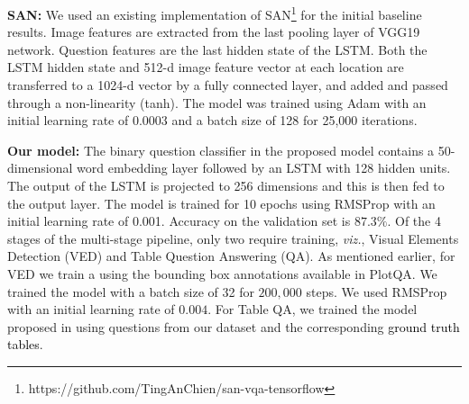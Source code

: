 \documentclass[10pt,twocolumn,letterpaper]{article}
\begin{document}
\noindent\textbf{SAN:} We used an existing implementation of SAN\footnote{https://github.com/TingAnChien/san-vqa-tensorflow} for the initial baseline results. Image features are extracted from the last pooling layer of VGG19 network. Question features are the last hidden state of the LSTM. Both the LSTM hidden state and 512-d image feature vector at each location are transferred to a 1024-d vector by a fully connected layer, and added and passed through a non-linearity (tanh). The model was trained using Adam \cite{Adam} with an initial learning rate of $0.0003$ and a batch size of 128 for 25,000 iterations.

\noindent\textbf{Our model:}
The binary question classifier in the proposed model contains a 50-dimensional word embedding layer followed by an LSTM with 128 hidden units. The output of the LSTM is projected to 256 dimensions and this is then fed to the output layer. The model is trained for 10 epochs using RMSProp with an initial learning rate of 0.001. Accuracy on the validation set is $87.3\%$.
Of the 4 stages of the multi-stage pipeline, only two require training, \textit{viz.}, Visual Elements Detection (VED) and Table Question Answering (QA). 
As mentioned earlier, for VED we train a  using the bounding box annotations available in PlotQA. 
We trained the model with a batch size of 32 for $200,000$ steps. We used RMSProp with an initial learning rate of $0.004$. 
For Table QA, we trained the model proposed in \cite{PasupatL15} using questions from our dataset and the corresponding \textcolor{black}{ground truth tables}. 

\end{document}
